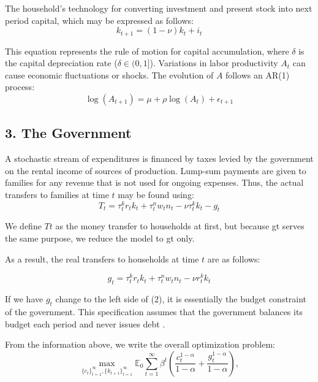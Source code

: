 \documentclass{article}
\begin{document}
The household's technology for converting investment and present stock into next period capital, which may be expressed as follows:
\begin{equation}
    k_{t+1} = (1 - \nu) k_t + i_t
\end{equation}

This equation represents the rule of motion for capital accumulation, where \( \delta \) is the capital depreciation rate (\( \delta \in (0,1] \)). Variations in labor productivity \( A_t \) can cause economic fluctuations or shocks. The evolution of \( A \) follows an AR(1) process:
\begin{equation}
    \log(A_{t+1}) = \mu + \rho \log(A_t) + \epsilon_{t+1}
\end{equation}

\subsection*{3. The Government}

A stochastic stream of expenditures is financed by taxes levied by the government on the rental income of sources of production. Lump-sum payments are given to families for any revenue that is not used for ongoing expenses. Thus, the actual transfers to families at time \( t \) may be found using:
\begin{equation}
    T_t = \tau^k_t r_t k_t + \tau^n_t w_t n_t - \nu \tau^k_t k_t - g_t
\end{equation}

We define \( Tt \) as the money transfer to households at first, but because gt serves the same purpose, we reduce the model to gt only.

As a result, the real transfers to households at time \( t \) are as follows:

\begin{equation}
    g_t = \tau_t^k r_t k_t + \tau_t^n w_t n_t - \nu r_t^k k_t 
\end{equation}

If we have \( g_t \) change to the left side of (2), it is essentially the budget constraint of the government. This specification assumes that the government balances its budget each period and never issues debt \cite{McGrattan1994}.

From the information above, we write the overall optimization problem:
\begin{equation}
    \max_{\{c_t\}_{t=1}^{\infty}, \{k_{t+1}\}_{t=1}^{\infty}} 
    \mathbb{E}_0 \sum_{t=1}^{\infty} \beta^t \left( \frac{c_t^{1-\alpha}}{1-\alpha} + \frac{g_t^{1-\alpha}}{1-\alpha} \right),
\end{equation}
\end{document}
